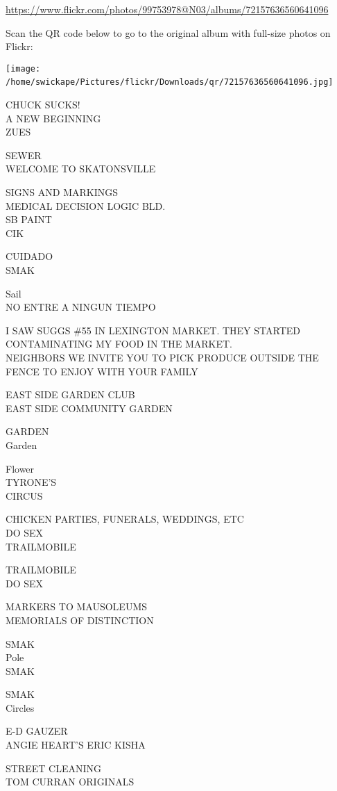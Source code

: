 \documentclass[10pt,letterpaper]{article}
\begin{document}
\url{https://www.flickr.com/photos/99753978@N03/albums/72157636560641096}

Scan the QR code below to go to the original album with full-size photos on Flickr:

\texttt{[image: /home/swickape/Pictures/flickr/Downloads/qr/72157636560641096.jpg]}
\

CHUCK SUCKS!\\
A NEW BEGINNING\\
ZUES

SEWER\\
WELCOME TO SKATONSVILLE

SIGNS AND MARKINGS\\
MEDICAL DECISION LOGIC BLD.\\
SB PAINT\\
CIK

CUIDADO\\
SMAK

Sail\\
NO ENTRE A NINGUN TIEMPO

I SAW SUGGS \#55 IN LEXINGTON MARKET.  THEY STARTED CONTAMINATING MY FOOD IN THE MARKET.\\
NEIGHBORS WE INVITE YOU TO PICK PRODUCE OUTSIDE THE FENCE TO ENJOY WITH YOUR FAMILY

EAST SIDE GARDEN CLUB\\
EAST SIDE COMMUNITY GARDEN

GARDEN\\
Garden

Flower\\
TYRONE'S\\
CIRCUS

CHICKEN PARTIES, FUNERALS, WEDDINGS, ETC\\
DO SEX\\
TRAILMOBILE

TRAILMOBILE\\
DO SEX

MARKERS TO MAUSOLEUMS\\
MEMORIALS OF DISTINCTION

SMAK\\
Pole\\
SMAK

SMAK\\
Circles

E{-}D GAUZER\\
ANGIE HEART'S ERIC KISHA

STREET CLEANING\\
TOM CURRAN ORIGINALS
\end{document}
